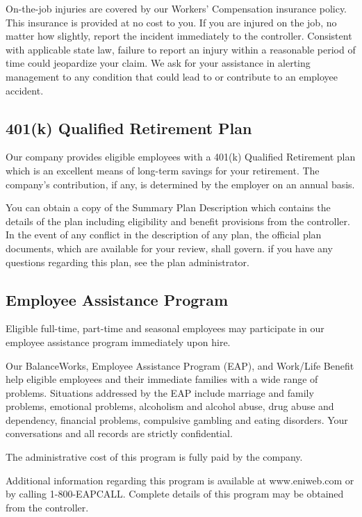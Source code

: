 On-the-job injuries are covered by our Workers’ Compensation insurance policy. This insurance is provided at no cost to you. If you are injured on the job, no matter how slightly, report the incident immediately to the controller. Consistent with applicable state law, failure to report an injury within a reasonable period of time could jeopardize your claim. We ask for your assistance in alerting management to any condition that could lead to or contribute to an employee accident.

\subsection{401(k) Qualified Retirement Plan}

Our company provides eligible employees with a 401(k) Qualified Retirement plan which is an excellent means of long-term savings for your retirement. The company's contribution, if any, is determined by the employer on an annual basis.

You can obtain a copy of the Summary Plan Description which contains the details of the plan including eligibility and benefit provisions from the controller. In the event of any conflict in the description of any plan, the official plan documents, which are available for your review, shall govern. if you have any questions regarding this plan, see the plan administrator.

\subsection{Employee Assistance Program}

Eligible full-time, part-time and seasonal employees may participate in our employee assistance program immediately upon hire.

Our BalanceWorks\textcopyright, Employee Assistance Program (EAP), and Work/Life Benefit help eligible employees and their immediate families with a wide range of problems. Situations addressed by the EAP include marriage and family problems, emotional problems, alcoholism and alcohol abuse, drug abuse and dependency, financial problems, compulsive gambling and eating disorders. Your conversations and all records are strictly confidential.

The administrative cost of this program is fully paid by the company.

Additional information regarding this program is available at www.eniweb.com or by calling 1-800-EAPCALL. Complete details of this program may be obtained from the controller.

